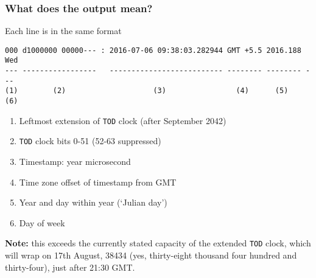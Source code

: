 \documentclass[10pt,xcolor=x11names]{beamer}
\newcommand{\tod}{\texttt{TOD}}
\begin{document}
\begin{frame}[fragile]
  \frametitle{What does the output mean?}
  \begin{block}{Each line is in the same format}
  \begin{lstlisting}
000 d1000000 00000--- : 2016-07-06 09:38:03.282944 GMT +5.5 2016.188 Wed
--- -----------------   -------------------------- -------- -------- ---
(1)        (2)                    (3)                (4)      (5)    (6)
  \end{lstlisting}
  \end{block}
  \begin{enumerate}
  \item Leftmost extension of \tod{} clock (after September 2042)
  \item \tod{} clock bits 0-51 (52-63 suppressed)
  \item Timestamp: year \textellipsis{} microsecond
  \item Time zone offset of timestamp from GMT
  \item Year and day within year (`Julian day')
  \item Day of week
  \end{enumerate}

  \textbf{Note:} this exceeds the currently stated capacity of the
  extended \tod{} clock, which will wrap on 17th August, 38434
  (yes,   thirty-eight thousand four hundred and thirty-four),
  just after 21:30 GMT. 

\end{frame}
\end{document}
